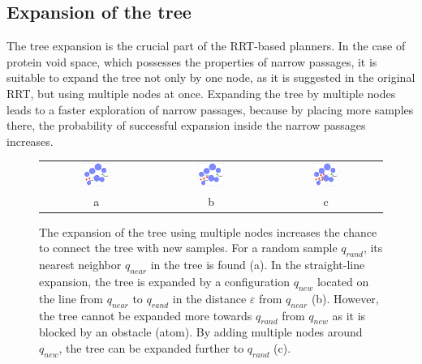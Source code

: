 \documentclass[usletter, 10pt, conference]{svjour3}      %
\def\qrand{q_{rand}}
\def\qnear{q_{near}}
\def\qnew{q_{new}}
\begin{document}
\subsection{Expansion of the tree}

The tree expansion is the crucial part of the RRT-based planners.
In the case of protein void space, which possesses the properties of narrow passages, it is suitable to expand the tree not only by one node, as it is suggested in the original RRT, but using multiple nodes at once.
Expanding the tree by multiple nodes leads to a faster exploration of narrow passages, because by placing more samples there, the probability of successful expansion inside the narrow passages increases.

\begin{figure}
\centering
{
\renewcommand{\tabcolsep}{3pt}
\begin{tabular}{ccc}
\includegraphics[width=0.25\textwidth]{fig/blosexp} &
\includegraphics[width=0.25\textwidth]{fig/blosexp2} & 
\includegraphics[width=0.25\textwidth]{fig/blosexp3} \\
a & b & c
\end{tabular}
}
\caption{\label{fig::blossom}
    The expansion of the tree using multiple nodes increases the chance to connect the tree with new samples.
For a random sample $\qrand$, its nearest neighbor $\qnear$ in the tree is found (a).
In the straight-line expansion, the tree is expanded by a configuration $\qnew$ located on the line from  $\qnear$ to $\qrand$ in the distance $\varepsilon$ from $\qnear$ (b).
However, the tree cannot be expanded more towards $\qrand$ from $\qnew$ as it is blocked by an obstacle (atom).
By adding multiple nodes around $\qnew$, the tree can be expanded further to $\qrand$ (c).
}
\end{figure}
\end{document}
